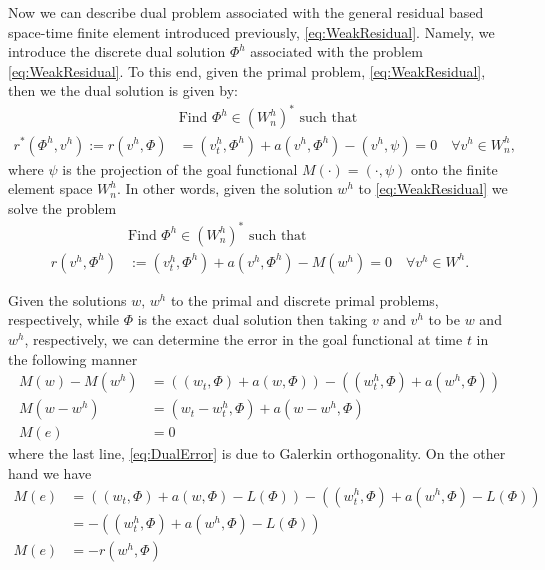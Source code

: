 Now we can describe dual problem associated with the general residual based
space-time finite element introduced previously, \eqref{eq:WeakResidual}.
Namely, we introduce the discrete dual solution $\Phi^h$ associated with the
problem \eqref{eq:WeakResidual}. To this end, given the primal problem,
\eqref{eq:WeakResidual}, then we the dual solution is given by:
\begin{equation*}
    \begin{split}
        &\text{Find } \Phi^h \in (W^h_n)^* \text{ such that} \\
        r^*(\Phi^h, v^h) := r(v^h, \Phi) &= (v^h_t, \Phi^h) + a(v^h, \Phi^h)
            - (v^h, \psi) = 0 \quad \forall v^h \in W^h_n,
    \end{split}
\end{equation*}
where $\psi$ is the projection of the goal functional $M(\cdot) = (\cdot, \psi)$
onto the finite element space $W^h_n$. In other words, given the solution $w^h$
to \eqref{eq:WeakResidual} we solve the problem
\begin{equation}
    \begin{split}
        &\text{Find } \Phi^h \in (W^h_n)^* \text{ such that} \\
        r(v^h, \Phi^h) &:= (v^h_t, \Phi^h) + a(v^h, \Phi^h) - M(w^h) = 0
                       \quad \forall v^h \in W^h.
    \end{split}
    \label{eq:Dual}
\end{equation}

Given the solutions $w,\, w^h$ to the primal and discrete primal problems,
respectively, while $\Phi$ is the exact dual solution then
taking $v$ and $v^h$ to be $w$ and $w^h$, respectively, we can determine the
error in the goal functional at time $t$ in the following manner
\begin{align}
    M(w) - M(w^h) &= \left((w_t, \Phi) + a(w, \Phi)\right)
                      - \left( (w^h_t, \Phi) + a(w^h, \Phi) \right) \nonumber \\
    M(w - w^h) &= (w_t - w^h_t, \Phi) + a(w - w^h, \Phi) \nonumber \\
    M(e) &= 0 \label{eq:DualError}
\end{align}
where the last line, \eqref{eq:DualError} is due to Galerkin orthogonality. On
the other hand we have
\begin{align}
    M(e) & = \left((w_t, \Phi) + a(w, \Phi) - L(\Phi)\right)
             - \left((w^h_t, \Phi) + a(w^h, \Phi) - L(\Phi) \right) \nonumber \\
    &= -\left((w^h_t, \Phi) + a(w^h, \Phi) - L(\Phi) \right) \nonumber \\
    M(e) &= -r(w^h, \Phi) \label{eq:ErrorRepresentation} \\
\end{align}

